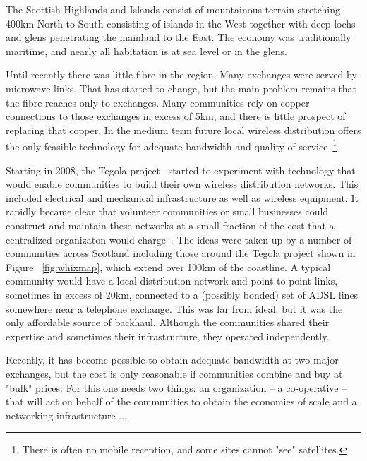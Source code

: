 
The Scottish Highlands and Islands consist of mountainous  terrain stretching 400km North to South consisting of islands in the West together with deep lochs and glens penetrating the mainland to the East.  The economy was traditionally maritime, and nearly all habitation is at sea level or in the glens.  

Until recently there was little fibre in the region.  Many exchanges were served by microwave links. That has started to change, but the main problem remains that the fibre reaches only to exchanges.  Many communities rely on copper connections to those exchanges in excess of 5km, and there is little prospect of replacing that copper.  In the medium term future local wireless distribution offers the only feasible technology for adequate bandwidth and quality of service~\footnote{There is often no mobile reception, and some sites cannot "see" satellites.}

Starting in 2008, the Tegola project~\cite{tegola} started to experiment with technology that would enable communities to build their own wireless distribution networks.  This included electrical and mechanical infrastructure as well as wireless equipment.  It rapidly became clear that volunteer communities or small businesses could construct and maintain these networks at a small fraction of the cost that a centralized organizaton would charge~. The ideas were taken up by a number of communities across Scotland including those around the Tegola project shown in Figure ~\ref{fig:whixmap}, which extend over 100km of the coastline. A typical community would have a local distribution network and point-to-point links, sometimes in excess of 20km, connected to a (possibly bonded) set of ADSL lines somewhere near a telephone exchange. This was far from ideal, but it was the only affordable source of backhaul. Although the communities shared their expertise and sometimes their infrastructure, they operated independently.


Recently, it has become possible to obtain adequate bandwidth at two major exchanges, but the cost is only reasonable if communities combine and buy at "bulk" prices.  For this one needs two things: an organization -- a co-operative -- that will act on behalf of the communities to obtain the economies of scale and a networking infrastructure ...

